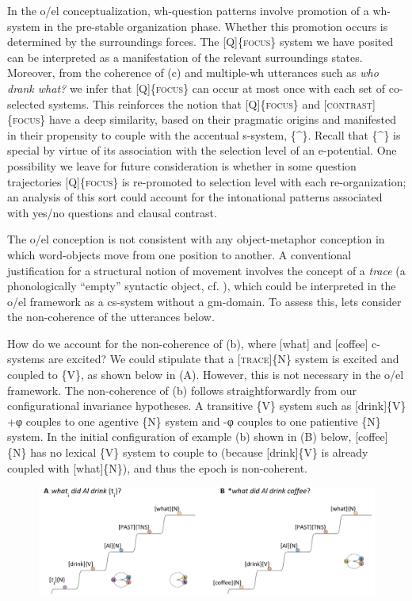   In the o/el conceptualization, wh-question patterns involve promotion of a wh-system in the pre-stable organization phase. Whether this promotion occurs is determined by the surroundings forces. The [\textsc{Q}]\{\textsc{focus}\} system we have posited can be interpreted as a manifestation of the relevant surroundings states. Moreover, from the coherence of (c) and multiple-wh utterances such as \textit{who drank what?} we infer that [Q]\{\textsc{focus}\} can occur at most once with each set of co-selected systems. This reinforces the notion that [Q]\{\textsc{focus}\} and [\textsc{contrast}]\{\textsc{focus}\} have a deep similarity, based on their pragmatic origins and manifested in their propensity to couple with the accentual s-system, \{\^{}\}. Recall that \{\^{}\} is special by virtue of its association with the selection level of an e-potential. One possibility we leave for future consideration is whether in some question trajectories [Q]\{\textsc{focus}\} is re-promoted to selection level with each re-organization; an analysis of this sort could account for the intonational patterns associated with yes/no questions and clausal contrast.

   The o/el conception is not consistent with any object-metaphor conception in which word-objects move from one position to another. A conventional justification for a structural notion of movement involves the concept of a \textit{trace} (a phonologically “empty” syntactic object, cf. \citealt{Chomsky1965}), which could be interpreted in the o/el framework as a cs-system without a gm-domain. To assess this, lets consider the non-coherence of the utterances below.

\ea
\z
\z

  How do we account for the non-coherence of (b), where [what] and [coffee] c-systems are excited?  We could stipulate that a [\textsc{trace}]\{N\} system is excited and coupled to \{V\}, as shown below in (A). However, this is not necessary in the o/el framework. The non-coherence of (b) follows straightforwardly from our configurational invariance hypotheses. A transitive \{V\} system such as [drink]\{V\} +φ couples to one agentive \{N\} system and -φ couples to one patientive \{N\} system. In the initial configuration of example (b) shown in (B) below, [coffee]\{N\} has no lexical \{V\} system to couple to (because [drink]\{V\} is already coupled with [what]\{N\}), and thus the epoch is non-coherent.

  
\begin{figure}
\includegraphics[width=\textwidth]{figures/Tilsen-img161.png}
\caption{\missingcaption}
\label{fig:}
\end{figure}
 

